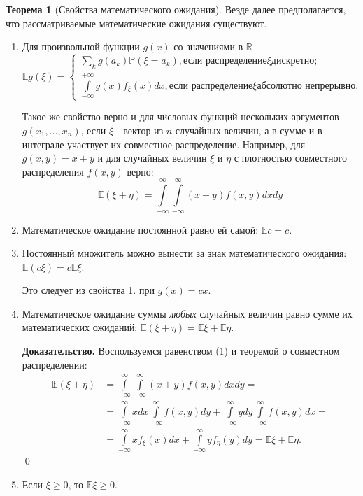 \documentclass[oneside,final,14pt]{extreport}
\renewenvironment{proof}{{\bfseries Доказательство.}}{\qed}
\theoremstyle{plain}
\theoremstyle{definition}
\theoremstyle{named}
\newtheorem*{namedthm}{Теорема}
\begin{document}
\begin{namedthm}[Свойства математического ожидания]
    Везде далее предполагается, что рассматриваемые математические ожидания существуют.
\begin{enumerate}
    \item Для произвольной функции $g(x)$ со значениями в $\mathbb{R}$
    $$\mathbb{E} g(\xi)=\left\{\begin{array}{l}\sum\limits_{k} g\left(a_{k}\right) \mathbb{P}\left(\xi=a_{k}\right), \text {если распределение} \xi \text {дискретно;} \\ \int\limits_{-\infty}^{+\infty} g(x) f_{\xi}(x) d x, \text {если распределение} \xi \text {абсолютно непрерывно.}\end{array}\right.$$
    
    Такое же свойство верно и для числовых функций нескольких аргументов $g(x_1, \ldots,x_n)$, если $\xi$ - вектор из $n$ случайных величин, а в сумме и в интеграле участвует их совместное распределение. Например, для $g(x,y) = x + y$ и для случайных величин $\xi$ и $\eta$ с плотностью совместного распределения $f(x,y)$ верно: 
    \begin{equation}
        \mathbb{E}(\xi+\eta)=\int\limits_{-\infty}^{\infty} \int\limits_{-\infty}^{\infty}(x+y) f(x, y) d x d y
    \end{equation}
    
    \item Математическое ожидание постоянной равно ей самой: $\mathbb{E} c=c.$
    \item Постоянный множитель можно вынести за знак математического ожидания: $\mathbb{E}(c\xi) = c\mathbb{E}\xi.$
    
    Это следует из свойства 1. при $g(x) = cx$.
    \item Математическое ожидание суммы {\it любых} случайных величин равно сумме их математических ожиданий: $\mathbb{E}(\xi + \eta) = \mathbb{E}\xi + \mathbb{E}\eta.$
    
    \begin{proof} Воспользуемся равенством (1) и теоремой о совместном распределении:
        $$\begin{aligned}
        \mathbb{E}(\xi+\eta) &=\int\limits_{-\infty}^{\infty} \int\limits_{-\infty}^{\infty}(x+y) f(x, y) d x d y=\\
        &=\int\limits_{-\infty}^{\infty} x d x \int\limits_{-\infty}^{\infty} f(x, y) d y+\int\limits_{-\infty}^{\infty} y d y \int\limits_{-\infty}^{\infty} f(x, y) d x=\\
        &=\int\limits_{-\infty}^{\infty} x f_{\xi}(x) d x+\int\limits_{-\infty}^{\infty} y f_{\eta}(y) d y=\mathbb{E} \xi+\mathbb{E} \eta.
        \end{aligned}$$
    \end{proof}
    \item Если $\xi \geqslant 0$, то $\mathbb{E}\xi \geqslant 0.$
    

\end{enumerate}
\end{namedthm}
\end{document}
